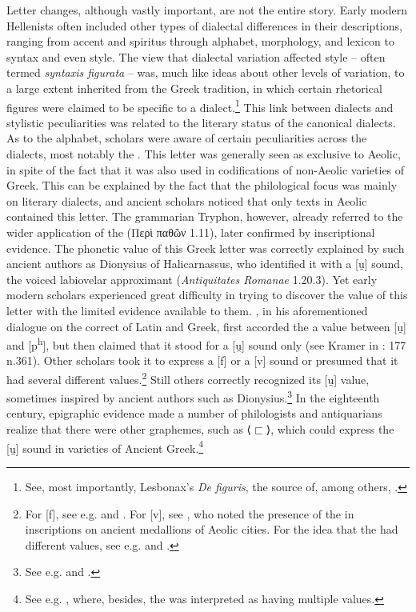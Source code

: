 Letter changes, although vastly important, are not the entire story. Early modern Hellenists often included other types of dialectal differences in their descriptions, ranging from accent and spiritus through alphabet, morphology, and lexicon to syntax and even style. The view that dialectal variation affected style – often termed \textit{syntaxis figurata} – was, much like ideas about other levels of variation, to a large extent inherited from the Greek tradition, in which certain rhetorical figures were claimed to be specific to a dialect.\footnote{{See, most importantly, Lesbonax’s} {\textit{De figuris}}{, the source of, among others, \citet[145--146]{Saumaise1643a}.}} This link between dialects and stylistic peculiarities was related to the literary status of the canonical dialects. As to the alphabet, scholars were aware of certain peculiarities across the dialects, most notably the . This letter was generally seen as exclusive to Aeolic, in spite of the fact that it was also used in codifications of non-Aeolic varieties of Greek. This can be explained by the fact that the philological focus was mainly on literary dialects, and ancient scholars noticed that only texts in Aeolic contained this letter. The grammarian Tryphon, however, already referred to the wider application of the  (Περὶ παθῶν 1.11), later confirmed by inscriptional evidence. The phonetic value of this Greek letter was correctly explained by such ancient authors as Dionysius of Halicarnassus, who identified it with a [u̯] sound, the voiced labiovelar approximant (\textit{Antiquitates Romanae} 1.20.3). Yet early modern scholars experienced great difficulty in trying to discover the value of this letter with the limited evidence available to them. \citet[68–69, 108]{Erasmus1528}, in his aforementioned dialogue on the correct  of Latin and Greek, first accorded the  a value between [u̯] and [p\textsuperscript{h}], but then claimed that it stood for a [u̯] sound only (see Kramer in \citealt{Erasmus1978}: 177 n.361). Other scholars took it to express a [f] or a [v] sound or presumed that it had several different values.\footnote{{For [f], see e.g. \citet[4]{Sylvius1531} and \citet[5]{Rhenius1626}. For [v], see \citet[108-109]{Freret1809}, who noted the presence of the  in inscriptions on ancient medallions of Aeolic cities. For the idea that the  had different values, see e.g. \citet[107-108]{Canini1555} and \citet[b.1{\textsc{\textsuperscript{r}}}{–b.2}{\textsc{\textsuperscript{v}}}]{ThryllitschBrunner1709}.}} Still others correctly recognized its [u̯] value, sometimes inspired by ancient authors such as Dionysius.\footnote{{See e.g. \citet[b.4{\textsc{\textsuperscript{r}}}]{KirchmaierCrusius1684} and \citet[19]{Reynolds1752}.}} In the eighteenth century, epigraphic evidence made a number of philologists and antiquarians realize that there were other graphemes, such as ⟨$⊏$⟩, which could express the [u̯] sound in varieties of Ancient Greek.\footnote{{See e.g. \citet[128-130]{Mazzocchi1754}, where, besides, the  was interpreted as having multiple values.}}


